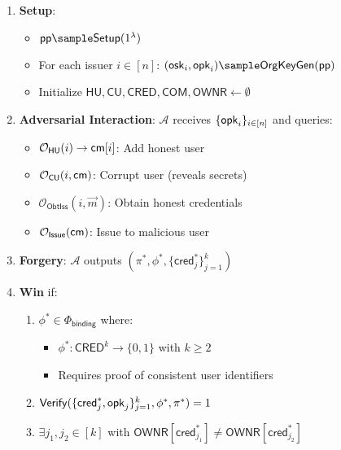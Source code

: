 \begin{enumerate}
    \item \textbf{Setup}:
    \begin{itemize}
        \item $\ppar \sample \mathsf{Setup}(1^\lambda)$ 
        \item For each issuer $i \in [n]$: $(\osk_i, \opk_i) \sample \mathsf{OrgKeyGen}(\ppar)$
        \item Initialize $\mathsf{HU}, \mathsf{CU}, \mathsf{CRED}, \mathsf{COM}, \mathsf{OWNR} \gets \emptyset$
    \end{itemize}
    
    \item \textbf{Adversarial Interaction}: $\mathcal{A}$ receives $\{\mathsf{opk}_i\}_{i \in [n]}$ and queries:
    \begin{itemize}
        \item $\mathcal{O}_{\mathsf{HU}}(i) \rightarrow \mathsf{cm}[i]$: Add honest user
        \item $\mathcal{O}_{\mathsf{CU}}(i, \mathsf{cm})$: Corrupt user (reveals secrets)
        \item $\mathcal{O}_{\mathsf{ObtIss}}(i, \vec{m})$: Obtain honest credentials
        \item $\mathcal{O}_{\mathsf{Issue}}(\mathsf{cm})$: Issue to malicious user
    \end{itemize}
    
    \item \textbf{Forgery}: $\mathcal{A}$ outputs $(\pi^*, \phi^*, \{\mathsf{cred}_j^*\}_{j=1}^k)$
    
    \item \textbf{Win} if:
    \begin{enumerate}
        \item $\phi^* \in \Phi_{\mathsf{binding}}$ where:
        \begin{itemize}
            \item $\phi^*: \mathsf{CRED}^k \rightarrow \{0,1\}$ with $k \geq 2$
            \item Requires proof of consistent user identifiers
        \end{itemize}
        \item $\mathsf{Verify}(\{\mathsf{cred}_j^*, \mathsf{opk}_j\}_{j=1}^k, \phi^*, \pi^*) = 1$
        \item $\exists j_1,j_2 \in [k]$ with $\mathsf{OWNR}[\mathsf{cred}_{j_1}^*] \neq \mathsf{OWNR}[\mathsf{cred}_{j_2}^*]$ 
    \end{enumerate}
\end{enumerate}

